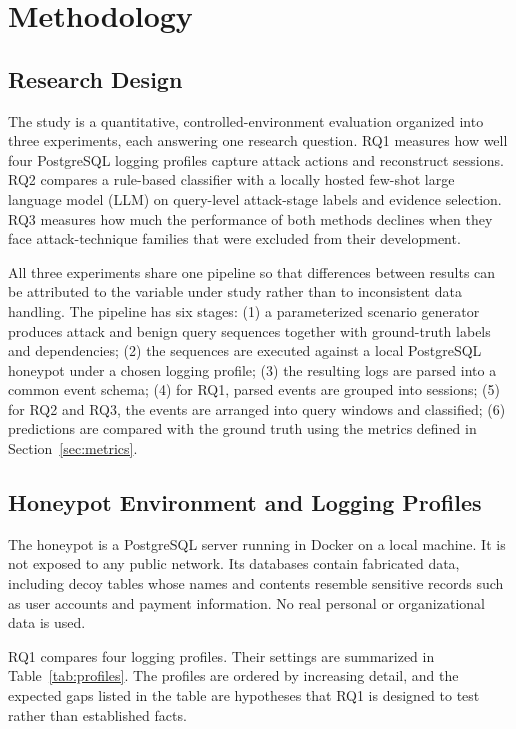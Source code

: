 \documentclass[12pt,a4paper]{report}
\begin{document}
\chapter{Methodology}

\section{Research Design}
The study is a quantitative, controlled-environment evaluation organized into three experiments, each answering one research question. RQ1 measures how well four PostgreSQL logging profiles capture attack actions and reconstruct sessions. RQ2 compares a rule-based classifier with a locally hosted few-shot large language model (LLM) on query-level attack-stage labels and evidence selection. RQ3 measures how much the performance of both methods declines when they face attack-technique families that were excluded from their development.

All three experiments share one pipeline so that differences between results can be attributed to the variable under study rather than to inconsistent data handling. The pipeline has six stages: (1) a parameterized scenario generator produces attack and benign query sequences together with ground-truth labels and dependencies; (2) the sequences are executed against a local PostgreSQL honeypot under a chosen logging profile; (3) the resulting logs are parsed into a common event schema; (4) for RQ1, parsed events are grouped into sessions; (5) for RQ2 and RQ3, the events are arranged into query windows and classified; (6) predictions are compared with the ground truth using the metrics defined in Section~\ref{sec:metrics}.

\section{Honeypot Environment and Logging Profiles}
The honeypot is a PostgreSQL server running in Docker on a local machine. It is not exposed to any public network. Its databases contain fabricated data, including decoy tables whose names and contents resemble sensitive records such as user accounts and payment information. No real personal or organizational data is used.

RQ1 compares four logging profiles. Their settings are summarized in Table~\ref{tab:profiles}. The profiles are ordered by increasing detail, and the expected gaps listed in the table are hypotheses that RQ1 is designed to test rather than established facts.
\end{document}
